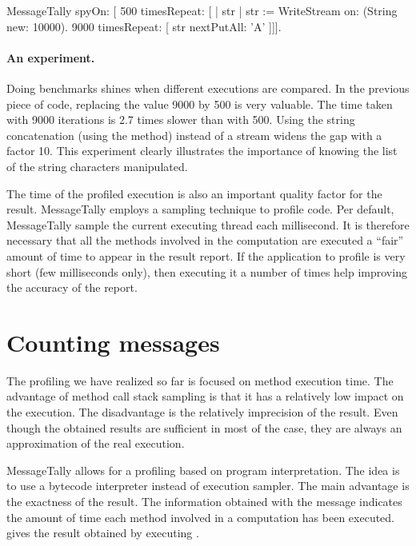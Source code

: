 \documentclass[a4paper,10pt,twoside]{book}
\begin{document}
\begin{code}{}
MessageTally spyOn: 
    [ 500 timesRepeat: [
                    | str |  
                    str := WriteStream on: (String new: 10000). 
                    9000 timesRepeat: [ str nextPutAll: 'A' ]]].
\end{code}

\paragraph{An experiment.}
Doing benchmarks shines when different executions are compared. In the previous piece of code, replacing the value 9000 by 500 is very valuable. The time taken with 9000 iterations is 2.7 times slower than with 500. Using the string concatenation (\ie using the \ct{,} method) instead of a stream widens the gap with a factor 10. This experiment clearly illustrates the importance of knowing the list of the string characters manipulated. 

The time of the profiled execution is also an important quality factor for the result. MessageTally employs a sampling technique to profile code. Per default, MessageTally sample the current executing thread each millisecond. It is therefore necessary that all the methods involved in the computation are executed a ``fair'' amount of time to appear in the result report. If the application to profile is very short (few milliseconds only), then executing it a number of times help improving the accuracy of the report. 



\section{Counting messages}
The profiling we have realized so far is focused on method execution time. The advantage of method call stack sampling is that it has a relatively low impact on the execution. The disadvantage is the relatively imprecision of the result. Even though the obtained results are sufficient in most of the case, they are always an approximation of the real execution.

MessageTally allows for a profiling based on program interpretation. The idea is to use a bytecode interpreter instead of execution sampler. The main advantage is the exactness of the result. The information obtained with the message  indicates the amount of time each method involved in a computation has been executed.  gives the result obtained by executing .
\end{document}
